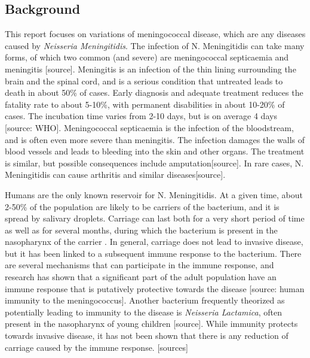 \documentclass[10pt,a4paper]{article}
\begin{document}




\subsection{Background}

This report focuses on variations of meningococcal disease, which are any diseases caused by \emph{Neisseria Meningitidis}. The infection of N. Meningitidis can take many forms, of which two common (and severe) are meningococcal septicaemia and meningitis [source]. Meningitis is an infection of the thin lining surrounding the brain and the spinal cord, and is a serious condition that untreated leads to death in about 50\% of cases. Early diagnosis and adequate treatment reduces the fatality rate to about 5-10\%, with permanent disabilities in about 10-20\% of cases. The incubation time varies from 2-10 days, but is on average 4 days [source: WHO]. Meningococcal septicaemia is the infection of the bloodstream, and is often even more severe than meningitis. The infection damages the walls of blood vessels and leads to bleeding into the skin and other organs. The treatment is similar, but possible consequences include amputation[source]. In rare cases, N. Meningitidis can cause arthritis and similar diseases[source].

Humans are the only known reservoir for N. Meningitidis. At a given time, about 2-50\% of the population are likely to be carriers of the bacterium, and it is spread by salivary droplets. Carriage can last both for a very short period of time as well as for several months, during which the bacterium is present in the nasopharynx of the carrier \cite{taha2002duality}. In general, carriage does not lead to invasive disease, but it has been linked to a subsequent immune response to the bacterium. There are several mechanisms that can participate in the immune response, and research has shown that a significant part of the adult population have an immune response that is putatively protective towards the disease [source: human immunity to the meningococcus]. Another bacterium frequently theorized as potentially leading to immunity to the disease is \emph{Neisseria Lactamica}, often present in the nasopharynx of young children [source]. While immunity protects towards invasive disease, it has not been shown that there is any reduction of carriage caused by the immune response. [sources]
\end{document}
